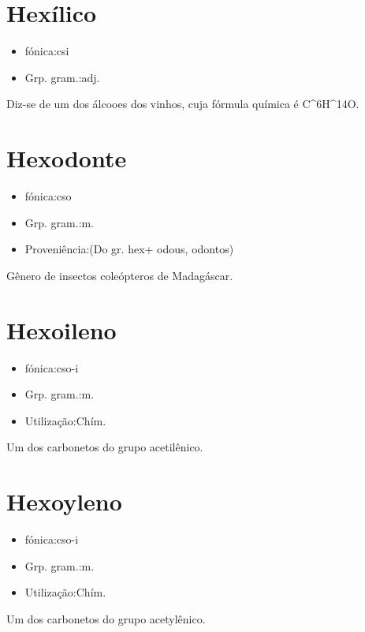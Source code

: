 \documentclass{article}
\begin{document}
\section{Hexílico}
\begin{itemize}
\item {fónica:csi}
\end{itemize}
\begin{itemize}
\item {Grp. gram.:adj.}
\end{itemize}
Diz-se de um dos álcooes dos vinhos, cuja fórmula química é C^{6}H^{14}O.
\section{Hexodonte}
\begin{itemize}
\item {fónica:cso}
\end{itemize}
\begin{itemize}
\item {Grp. gram.:m.}
\end{itemize}
\begin{itemize}
\item {Proveniência:(Do gr. \textunderscore hex\textunderscore  + \textunderscore odous\textunderscore , \textunderscore odontos\textunderscore )}
\end{itemize}
Gênero de insectos coleópteros de Madagáscar.
\section{Hexoileno}
\begin{itemize}
\item {fónica:cso-i}
\end{itemize}
\begin{itemize}
\item {Grp. gram.:m.}
\end{itemize}
\begin{itemize}
\item {Utilização:Chím.}
\end{itemize}
Um dos carbonetos do grupo acetilênico.
\section{Hexoyleno}
\begin{itemize}
\item {fónica:cso-i}
\end{itemize}
\begin{itemize}
\item {Grp. gram.:m.}
\end{itemize}
\begin{itemize}
\item {Utilização:Chím.}
\end{itemize}
Um dos carbonetos do grupo acetylênico.
\end{document}
